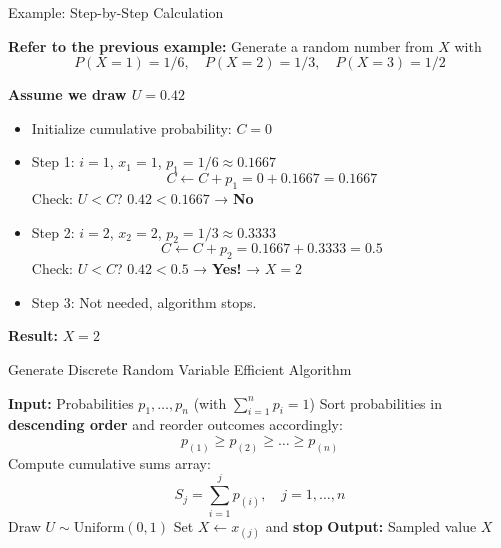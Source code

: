 \documentclass[8pt]{beamer}
\begin{document}
\begin{frame}{Example: Step-by-Step Calculation}

{\bf Refer to the previous example:} Generate a random number from $X$ with
\[
P(X=1)=1/6, \quad P(X=2)=1/3, \quad P(X=3)=1/2
\]

\vspace{2mm}
{\bf Assume we draw $U = 0.42$}

\begin{itemize}
    \item Initialize cumulative probability: $C = 0$
    \item Step 1: $i=1$, $x_1 = 1$, $p_1 = 1/6 \approx 0.1667$  
    \[
    C \gets C + p_1 = 0 + 0.1667 = 0.1667
    \]  
    Check: $U < C$? $0.42 < 0.1667$ → \textbf{No}
    
    \item Step 2: $i=2$, $x_2 = 2$, $p_2 = 1/3 \approx 0.3333$  
    \[
    C \gets C + p_2 = 0.1667 + 0.3333 = 0.5
    \]  
    Check: $U < C$? $0.42 < 0.5$ → \textbf{Yes!} → $X = 2$
    
    \item Step 3: Not needed, algorithm stops.
\end{itemize}

\vspace{1mm}
\textbf{Result:} $X = 2$

\end{frame}


\begin{frame}{Generate Discrete Random Variable Efficient Algorithm}

\begin{algorithm}[H]
    \caption{Generate $X$ with probabilities $p_1, \dots, p_n$ using cumulative sums}\label{alg:discrete-cumsum-sorted}
    \begin{algorithmic}[1]
        \small
        \State \textbf{Input:} Probabilities $p_1, \dots, p_n$ (with $\sum_{i=1}^n p_i = 1$)
        \State Sort probabilities in \textbf{descending order} and reorder outcomes accordingly:
		$$
 		p_{(1)} \ge p_{(2)} \ge \dots \ge p_{(n)}
		$$
        \State Compute cumulative sums array:
        $$
            S_j = \sum_{i=1}^{j} p_{(i)}, \quad j = 1, \dots, n
        $$
        \State Draw $U \sim \text{Uniform}(0,1)$
                \State Set $X \gets x_{(j)}$ and \textbf{stop}
            \EndIf
        \EndFor
        \State \textbf{Output:} Sampled value $X$
    \end{algorithmic}
\end{algorithm}
\end{frame}
\end{document}
